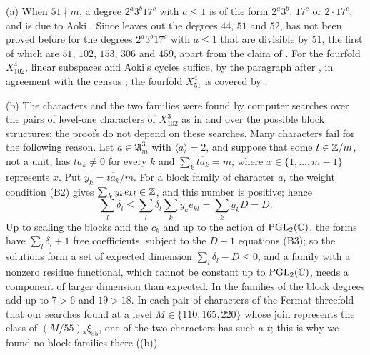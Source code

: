 \begin{remark}\label{rem:new51}
(a) When $51\nmid m$, a degree $2^{a}3^{b}17^{c}$ with $a\le1$ is of the form
$2^{a}3^{b}$, $17^{c}$ or $2\cdot17^{c}$, and  is due to
Aoki \cite{Aok87,Aok00}. Since \cite{MMRV26} leaves out the degrees $44$,
$51$ and $52$,  has not been proved before for the
degrees $2^{a}3^{b}17^{c}$ with $a\le1$ that are divisible by $51$, the first
of which are $51$, $102$, $153$, $306$ and $459$, apart from the claim of
\cite{OAI26}. For the fourfold $X^{4}_{102}$, linear subspaces and Aoki's
cycles suffice, by the paragraph after , in agreement with
the census \cite{Jum26b}; the fourfold $X^{4}_{51}$ is covered by
.

(b) The characters and the two families were found by computer searches
over the pairs of level-one characters of $X^{3}_{102}$ as in
 and over the possible block structures; the proofs do not
depend on these searches. Many characters fail for the following reason.
Let $a\in\mathfrak A^{3}_{m}$ with $\langle a\rangle=2$, and suppose that
some $t\in\mathbb{Z}/m$, not a unit, has $ta_{k}\ne0$ for every $k$ and
$\sum_{k}\overline{ta_{k}}=m$, where $\overline{x}\in\{1,\dots,m-1\}$
represents $x$. Put $y_{k}=\overline{ta_{k}}/m$. For a block family of
character $a$, the weight condition (B2) gives $\sum_{k}y_{k}e_{kl}\in\mathbb{Z}$,
and this number is positive; hence
\[
  \sum_{l}\delta_{l}\le\sum_{l}\delta_{l}\sum_{k}y_{k}e_{kl}
  =\sum_{k}y_{k}D=D .
\]
Up to scaling the blocks and the $c_{k}$ and up to the action of
$\mathrm{PGL}_{2}(\mathbb{C})$, the forms have $\sum_{l}\delta_{l}+1$ free
coefficients, subject to the $D+1$ equations (B3); so the solutions form a
set of expected dimension $\sum_{l}\delta_{l}-D\le0$, and a family with a
nonzero residue functional, which cannot be constant up to
$\mathrm{PGL}_{2}(\mathbb{C})$, needs a component of larger dimension than
expected. In the families of
 the block degrees add up to $7>6$ and
$19>18$. In each pair of characters of the Fermat threefold that our
searches found at a level $M\in\{110,165,220\}$ whose join represents the
class of $(M/55)_{*}\xi_{55}$, one of the two characters has such a $t$;
this is why we found no block families there ((b)).
\end{remark}

